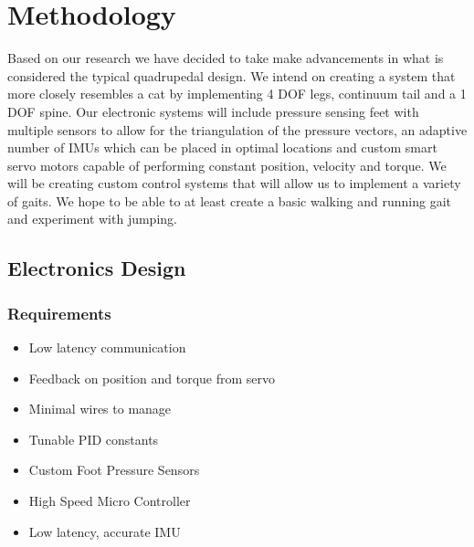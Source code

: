 \section{Methodology}
Based on our research we have decided to take make advancements in what is considered the typical quadrupedal design. We intend on creating a system that more closely resembles a cat by implementing 4 DOF legs, continuum tail and a 1 DOF spine. Our electronic systems will include pressure sensing feet with multiple sensors to allow for the triangulation of the pressure vectors, an adaptive number of IMUs which can be placed in optimal locations and custom smart servo motors capable of performing constant position, velocity and torque. We will be creating custom control systems that will allow us to implement a variety of gaits. We hope to be able to at least create a basic walking and running gait and experiment with jumping.
\subsection{Electronics Design}

    \subsubsection{Requirements}
        \begin{itemize} %
            \item Low latency communication
            \item Feedback on position and torque from servo
            \item Minimal wires to manage
            \item Tunable PID constants
            \item Custom Foot Pressure Sensors
            \item High Speed Micro Controller
            \item Low latency, accurate IMU
        \end{itemize}
